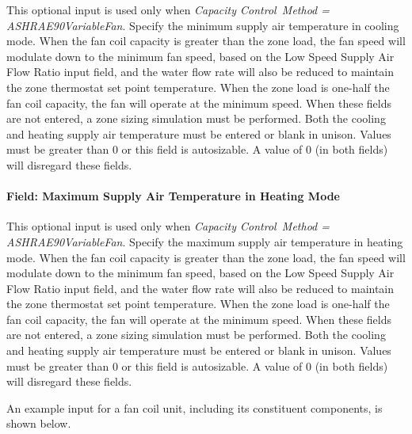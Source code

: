 This optional input is used only when \emph{Capacity Control~Method = ASHRAE90VariableFan}. Specify the minimum supply air temperature in cooling mode. When the fan coil capacity is greater than the zone load, the fan speed will modulate down to the minimum fan speed, based on the Low Speed Supply Air Flow Ratio input field, and the water flow rate will also be reduced to maintain the zone thermostat set point temperature. When the zone load is one-half the fan coil capacity, the fan will operate at the minimum speed. When these fields are not entered, a zone sizing simulation must be performed. Both the cooling and heating supply air temperature must be entered or blank in unison. Values must be greater than 0 or this field is autosizable. A value of 0 (in both fields) will disregard these fields.

\paragraph{Field: Maximum Supply Air Temperature in Heating Mode}\label{field-maximum-supply-air-temperature-in-heating-mode}

This optional input is used only when \emph{Capacity Control~Method = ASHRAE90VariableFan}. Specify the maximum supply air temperature in heating mode. When the fan coil capacity is greater than the zone load, the fan speed will modulate down to the minimum fan speed, based on the Low Speed Supply Air Flow Ratio input field, and the water flow rate will also be reduced to maintain the zone thermostat set point temperature. When the zone load is one-half the fan coil capacity, the fan will operate at the minimum speed. When these fields are not entered, a zone sizing simulation must be performed. Both the cooling and heating supply air temperature must be entered or blank in unison. Values must be greater than 0 or this field is autosizable. A value of 0 (in both fields) will disregard these fields.

An example input for a fan coil unit, including its constituent components, is shown below.

